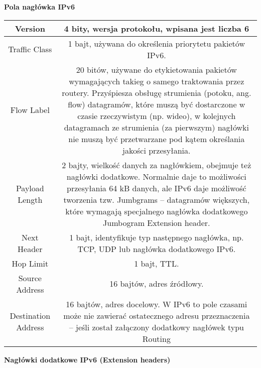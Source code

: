     \textbf{Pola nagłówka IPv6}

    \begin{tabular}{|c|c|}
        \hline
        Version & 4 bity, wersja protokołu, wpisana jest liczba 6\\

        \hline
        Traffic Class & 1 bajt, używana do określenia priorytetu pakietów IPv6.\\

        \hline
        Flow Label & 20 bitów, używane do etykietowania pakietów wymagających takieg o
        samego traktowania przez routery. Przyśpiesza obsługę strumienia
        (potoku, ang. flow) datagramów, które muszą być dostarczone w czasie
        rzeczywistym (np. wideo), w kolejnych datagramach ze strumienia (za
        pierwszym) nagłówki nie muszą być przetwarzane pod kątem
        określania jakości przesyłania.\\

        \hline
        Payload Length & 2 bajty, wielkość danych za nagłówkiem, obejmuje też nagłówki
        dodatkowe. Normalnie daje to możliwości przesyłania 64 kB danych,
        ale IPv6 daje możliwość tworzenia tzw. Jumbgrams – datagramów
        większych, które wymagają specjalnego nagłówka dodatkowego
        Jumbogram Extension header.\\

        \hline
        Next Header & 1 bajt, identyfikuje typ następnego nagłówka, np. TCP, UDP lub
        nagłówka dodatkowego IPv6.\\

        \hline
        Hop Limit & 1 bajt, TTL.\\

        \hline
        Source Address & 16 bajtów, adres źródłowy.\\

        \hline
        Destination Address & 16 bajtów, adres docelowy. W IPv6 to pole czasami może nie zawierać
        ostatecznego adresu przeznaczenia – jeśli został załączony dodatkowy
        nagłówek typu Routing\\
        \hline
    \end{tabular}


    \textbf{Nagłówki dodatkowe IPv6 (Extension headers)}

